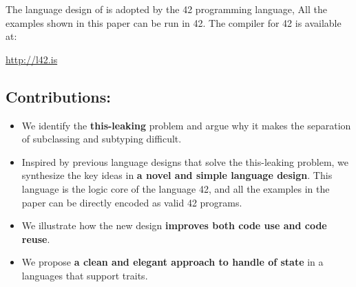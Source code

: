 
The language design of \name is adopted by the 42 programming 
language, All the examples shown in this paper can be run in 42.
The compiler for 42 is available at: 

\url{http://l42.is}


\begin{comment}
First we show a minimal language that illustrates the basic ideas. 
Then we show how mutually recursive types
are supported, how state/constructors/fields are supported,
how we can extend the language with nested classes.
Finally we show 42, a full blown language build around our ideas of
reuse.

Our design leverage on traits~\cite{ducasse2006traits}: a well know mechanisms for pure
code reuse.
\end{comment}

\subsection{Contributions:}
\begin{itemize}
\item We identify the {\bf this-leaking} problem and argue why it
  makes the separation of subclassing and subtyping difficult.
\item Inspired by previous language designs that solve the
  this-leaking problem, we synthesize the key ideas in {\bf a novel and
  simple language design}. This language is the logic core of the language 42, and 
  all the examples in the paper can be directly encoded as valid 42 programs. 

\item We illustrate how the new design {\bf improves both code use and code
  reuse}.
\item We propose {\bf a clean and elegant approach to handle of state} in a
  languages that support traits.

\begin{comment}
\item simple approach to fully separate inheritance and subtyping
\item easy to grasp model of compilation were typing is late but not
  too late (lazy?)\bruno{this idea is important: it's a key design
    decision. We need to talk about it in the introduction and offer
    some motivation/justification. }
\item clean and elegant handling of state in trat/module composition language
\item extension with nested classes is natural and
  powefull\bruno{wondering if this is necessary. I think there are
    several interesting/novel ideas already. Covering too much will
    result on not saying enough about each individual ideas.}
\item more operators can be accomodated without changing the general
  model
\end{comment}
\end{itemize}




